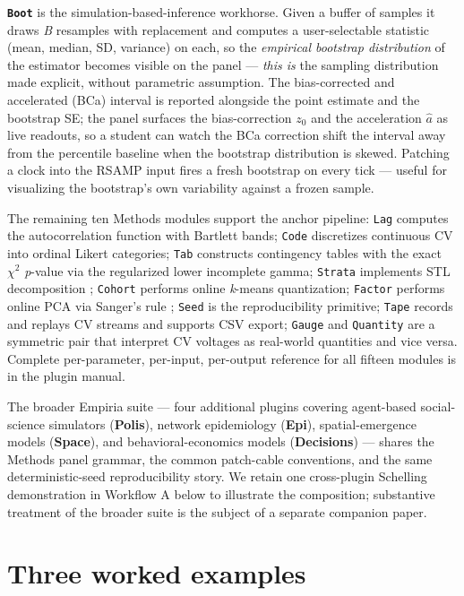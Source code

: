 \textbf{\texttt{Boot}} is the simulation-based-inference workhorse.
Given a buffer of samples it draws \emph{B} resamples with
replacement and computes a user-selectable statistic (mean, median,
SD, variance) on each, so the \emph{empirical bootstrap
distribution} of the estimator becomes visible on the panel ---
\emph{this is} the sampling distribution made explicit, without
parametric assumption. The bias-corrected and accelerated (BCa)
interval \citep{efron1987} is reported alongside the point estimate
and the bootstrap SE; the panel surfaces the bias-correction $z_0$
and the acceleration $\hat a$ as live readouts, so a student can
watch the BCa correction shift the interval away from the
percentile baseline when the bootstrap distribution is skewed.
Patching a clock into the RSAMP input fires a fresh bootstrap on
every tick --- useful for visualizing the bootstrap's own
variability against a frozen sample.

The remaining ten Methods modules support the anchor pipeline:
\texttt{Lag} computes the autocorrelation function with Bartlett
bands; \texttt{Code} discretizes continuous CV into ordinal Likert
categories; \texttt{Tab} constructs contingency tables with the
exact $\chi^2$ \emph{p}-value via the regularized lower incomplete
gamma; \texttt{Strata} implements STL decomposition
\citep{cleveland1990}; \texttt{Cohort} performs online \emph{k}-means
quantization; \texttt{Factor} performs online PCA via Sanger's rule
\citep{sanger1989}; \texttt{Seed} is the reproducibility primitive;
\texttt{Tape} records and replays CV streams and supports CSV
export; \texttt{Gauge} and \texttt{Quantity} are a symmetric pair
that interpret CV voltages as real-world quantities and vice versa.
Complete per-parameter, per-input, per-output reference for all
fifteen modules is in the plugin manual.

The broader Empiria suite --- four additional plugins covering
agent-based social-science simulators (\textbf{Polis}), network
epidemiology (\textbf{Epi}), spatial-emergence models
(\textbf{Space}), and behavioral-economics models
(\textbf{Decisions}) --- shares the Methods panel grammar, the
common patch-cable conventions, and the same deterministic-seed
reproducibility story. We retain one cross-plugin Schelling
demonstration in Workflow A below to illustrate the composition;
substantive treatment of the broader suite is the subject of a
separate companion paper.

\section{Three worked examples}\label{three-worked-examples}

